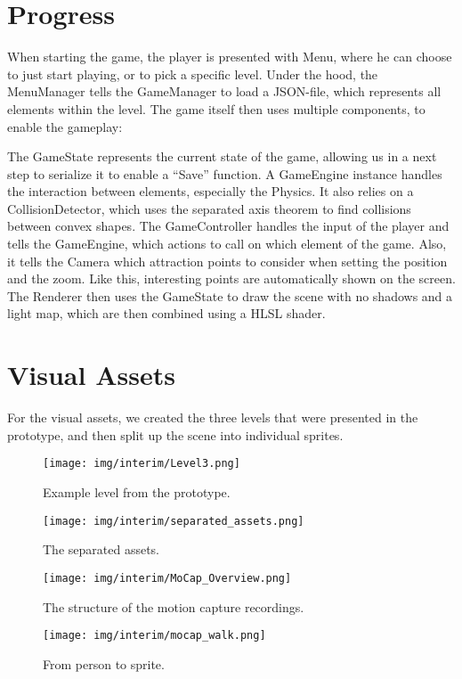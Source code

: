 \section{Progress}
When starting the game, the player is presented with Menu, where he can choose to just start playing, or to pick a specific level. 
Under the hood, the MenuManager tells the GameManager to load a JSON-file, which represents all elements within the level. 
The game itself then uses multiple components, to enable the gameplay:

The GameState represents the current state of the game, allowing us in a next step to serialize it to enable a \enquote{Save} function. A GameEngine instance handles the interaction between elements, especially the Physics. It also relies on a CollisionDetector, which uses the separated axis theorem to find collisions between convex shapes. The GameController handles the input of the player and tells the GameEngine, which actions to call on which element of the game. Also, it tells the Camera which attraction points to consider when setting the position and the zoom. Like this, interesting points are automatically shown on the screen. The Renderer then uses the GameState to draw the scene with no shadows and a light map, which are then combined using a HLSL shader. 

\section*{Visual Assets}
For the visual assets, we created the three levels that were presented in the prototype, and then split up the scene into individual sprites.
\begin{figure}
\centering
\texttt{[image: img/interim/Level3.png]}
\caption{Example level from the prototype.}
\end{figure}

\begin{figure}
\centering
\texttt{[image: img/interim/separated\_assets.png]}
\caption{The separated assets.}
\end{figure}

\begin{figure}
\centering
\texttt{[image: img/interim/MoCap\_Overview.png]}
\caption{ The structure of the motion capture recordings.}
\end{figure}

\begin{figure}
\centering
\texttt{[image: img/interim/mocap\_walk.png]}
\caption{ From person to sprite.}
\end{figure}


